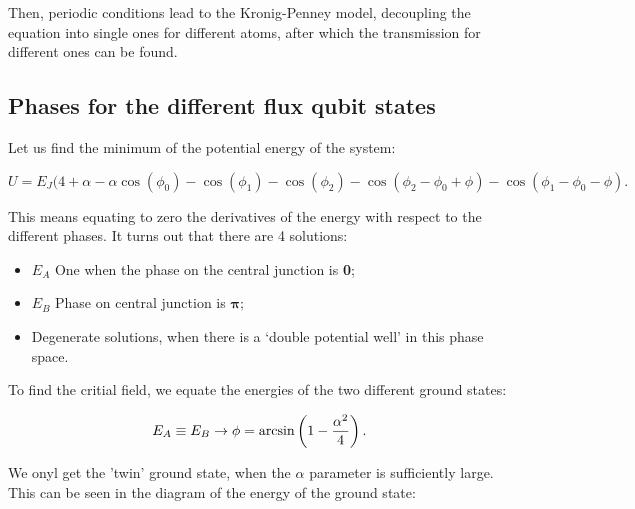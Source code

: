   Then, periodic conditions lead to the Kronig-Penney model, decoupling the equation into single ones for different atoms, after which the transmission for different ones can be found. 
  

\subsection{Phases for the different flux qubit states}
 Let us find the minimum of the potential energy of the system:
 
 \begin{equation}\label{key}
 	U = E_J(4+\alpha -\alpha\cos(\phi_0) - \cos(\phi_1) - \cos(\phi_2) - \cos(\phi_2 - \phi_0 + \phi) - \cos(\phi_1 - \phi_0 - \phi).
 \end{equation}
 
 \noindent This means equating to zero the derivatives of the energy with respect to the different phases. It turns out that there are 4 solutions:

 \begin{itemize}
 	\item $ E_A $ One when the phase on the central junction is \textbf{0};
 	\item $ E_B $ Phase on central junction is $ \mathbf{\pi} $;
 	\item Degenerate solutions, when there is a `double potential well' in this phase space.
 \end{itemize}


 To find the critial field, we equate the energies of the two different ground states:
 
 \begin{equation}\label{key}
 	E_A \equiv E_B \rightarrow \phi = \arcsin\left(1-\frac{\alpha^2}{4}\right).
 \end{equation}
 
 \noindent We onyl get the 'twin' ground state, when the $ \alpha $ parameter is sufficiently large. This can be seen in the diagram of the energy of the ground state:
 

 \newpage